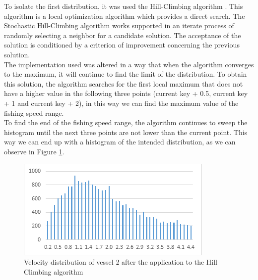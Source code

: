 To isolate the first distribution, it was used the Hill-Climbing algorithm \cite{Kvasnicka1995HillCW}.  This algorithm is a local optimization algorithm which provides a direct search. The Stochastic Hill-Climbing algorithm works supported in an iterate process of randomly selecting a neighbor for a candidate solution. The acceptance of the solution is conditioned by a criterion of improvement concerning the previous solution.\\
The implementation used was altered in a way that when the algorithm converges to the maximum, it will continue to find the limit of the distribution.
To obtain this solution, the algorithm searches for the first local maximum that does not have a higher value in the following three points (current key + 0.5, current key + 1 and current key + 2), in this way we can find the maximum value of the fishing speed range. \\
To find the end of the fishing speed range, the algorithm continues to sweep the histogram until the next three points are not lower than the current point.
This way we can end up with a histogram of the intended distribution, as we can observe in Figure  \ref{fig:sog_hill_climbing}.

\begin{figure}[H]
    \centering
    \includegraphics[width=0.8\linewidth]{Chapters/img/sog_hill_climbing.png}
    \caption{Velocity distribution of vessel 2 after the application to the Hill Climbing algorithm}
    \label{fig:sog_hill_climbing}
\end{figure}

